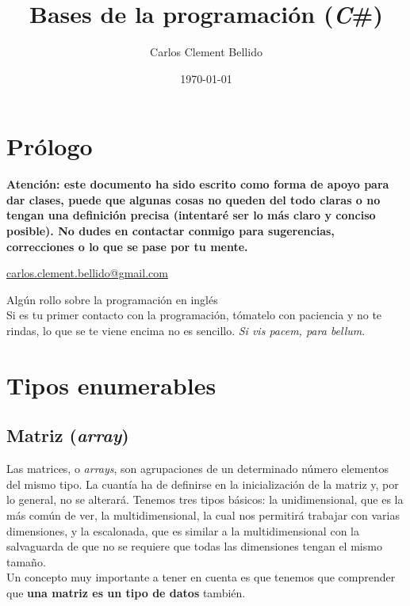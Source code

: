 \documentclass[11pt, oneside]{book}		%
\title{Bases de la programación (\textit{C}\#)}
\author{Carlos Clement Bellido}
\date{\today}
\begin{document}
	
\maketitle 	
\tableofcontents

\chapter*{Prólogo}
\textbf{Atención: este documento ha sido escrito como forma de apoyo para dar clases, puede que algunas cosas no queden del todo claras o no tengan una definición precisa (intentaré ser lo más claro y conciso posible). No dudes en contactar conmigo para sugerencias, correcciones o lo que se pase por tu mente.}
\begin{center}
	\href{mailto:carlos.clement.bellido@gmail.com}{carlos.clement.bellido@gmail.com}
\end{center}
Algún rollo sobre la programación en inglés\\
Si es tu primer contacto con la programación, tómatelo con paciencia y no te rindas, lo que se te viene encima no es sencillo. \textit{Si vis pacem, para bellum}.

\chapter{Tipos enumerables}
	\section{Matriz (\textit{array})}
	Las matrices, o \textit{arrays}\cite{msdn:array}, son agrupaciones de un determinado número elementos del mismo tipo. La cuantía ha de definirse en la inicialización de la matriz y, por lo general, no se alterará. Tenemos tres tipos básicos: la unidimensional, que es la más común de ver, la multidimensional, la cual nos permitirá trabajar con varias dimensiones, y la escalonada, que es similar a la multidimensional con la salvaguarda de que no se requiere que todas las dimensiones tengan el mismo tamaño.\\
	Un concepto muy importante a tener en cuenta es que tenemos que comprender que \textbf{una matriz es un tipo de datos} también.
\end{document}
